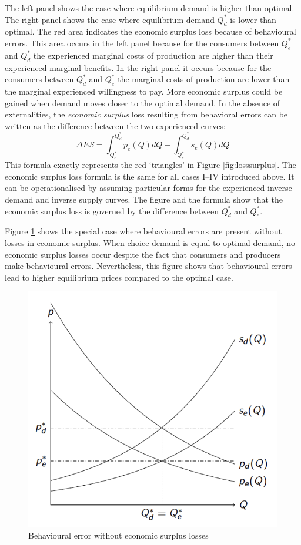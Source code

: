 \documentclass[
]{book}
\begin{document}
The left panel shows the case where equilibrium demand is higher than optimal. The right panel shows the case where equilibrium demand \(Q_d^*\) is lower than optimal. The red area indicates the economic surplus loss because of behavioural errors. This area occurs in the left panel because for the consumers between \(Q_e^*\) and \(Q_d^*\) the experienced marginal costs of production are higher than their experienced marginal benefits. In the right panel it occurs because for the consumers between \(Q_d^*\) and \(Q_e^*\) the marginal costs of production are lower than the marginal experienced willingness to pay. More economic surplus could be gained when demand moves closer to the optimal demand. In the absence of externalities, the \emph{economic surplus} loss resulting from behavioral errors can be written as the difference between the two experienced curves:
\begin{equation}
\Delta ES = \int_{Q_e^*}^{Q_d^*} p_e(Q) dQ -  \int_{Q_e^*}^{Q_d^*} s_e(Q) dQ 
\end{equation}
This formula exactly represents the red `triangles' in Figure \ref{fig:losssurplus}. The economic surplus loss formula is the same for all cases I--IV introduced above. It can be operationalised by assuming particular forms for the experienced inverse demand and inverse supply curves. The figure and the formula show that the economic surplus loss is governed by the difference between \(Q_d^*\) and \(Q_e^*\).

Figure \ref{fig:nolosssurplus} shows the special case where behavioural errors are present without losses in economic surplus. When choice demand is equal to optimal demand, no economic surplus losses occur despite the fact that consumers and producers make behavioural errors. Nevertheless, this figure shows that behavioural errors lead to higher equilibrium prices compared to the optimal case.

\begin{figure}
\includegraphics[width=8.72in]{./figures/nolosssurplus} \caption{Behavioural error without economic surplus losses}\label{fig:nolosssurplus}
\end{figure}
\end{document}
